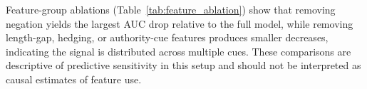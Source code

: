 Feature-group ablations (Table~\ref{tab:feature_ablation}) show that removing negation yields the largest AUC drop relative to the full model, while removing length-gap, hedging, or authority-cue features produces smaller decreases, indicating the signal is distributed across multiple cues. These comparisons are descriptive of predictive sensitivity in this setup and should not be interpreted as causal estimates of feature use.
